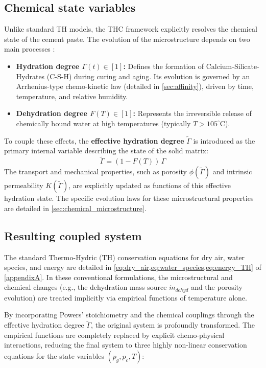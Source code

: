 \subsection{Chemical state variables}
Unlike standard TH models, the THC framework explicitly resolves the chemical state of the cement paste. The evolution of the microstructure depends on two main processes \cite{sciume2024}:
\begin{itemize}
    \item \textbf{Hydration degree $\Gamma(t) \in [1]$:} Defines the formation of Calcium-Silicate-Hydrates (C-S-H) during curing and aging. Its evolution is governed by an Arrhenius-type chemo-kinetic law (detailed in \cref{sec:affinity}), driven by time, temperature, and relative humidity.
    \item \textbf{Dehydration degree $F(T) \in [1]$:} Represents the irreversible release of chemically bound water at high temperatures (typically $T > 105^\circ\mathrm{C}$).
\end{itemize}
To couple these effects, the \textbf{effective hydration degree} $\tilde{\Gamma}$ is introduced as the primary internal variable describing the state of the solid matrix:
\begin{equation}
    \tilde{\Gamma} = (1 - F(T))\,\Gamma
    \label{eq:effective-hydration}
\end{equation}
The transport and mechanical properties, such as porosity $\phi(\tilde{\Gamma})$ and intrinsic permeability $K(\tilde{\Gamma})$, are explicitly updated as functions of this effective hydration state. The specific evolution laws for these microstructural properties are detailed in \cref{sec:chemical_microstructure}.

\subsection{Resulting coupled system}
The standard Thermo-Hydric (TH) conservation equations for dry air, water species, and energy are detailed in \cref{eq:dry_air,eq:water_species,eq:energy_TH} of \cref{appendixA}. In these conventional formulations, the microstructural and chemical changes (e.g., the dehydration mass source $\dot{m}_{dehyd}$ and the porosity evolution) are treated implicitly via empirical functions of temperature alone.

By incorporating Powers' stoichiometry and the chemical couplings through the effective hydration degree $\tilde{\Gamma}$, the original system is profoundly transformed. The empirical functions are completely replaced by explicit chemo-physical interactions, reducing the final system to three highly non-linear conservation equations for the state variables $(p_g, p_c, T)$:

